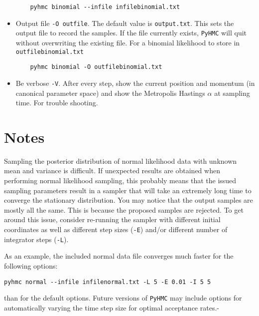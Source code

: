 \documentclass[10pt,letterpaper]{article}
\begin{document}
\begin{itemize}
\begin{verbatim}
	pyhmc binomial --infile infilebinomial.txt
\end{verbatim}

	\item Output file \texttt{-O outfile}.  The default value is
		\texttt{output.txt}.  This sets the output file to record the samples.
		If the file currently exists, \texttt{PyHMC} will quit without
		overwriting the existing file.  For a binomial likelihood to store in
		\texttt{outfilebinomial.txt}

\begin{verbatim}
	pyhmc binomial -O outfilebinomial.txt
\end{verbatim}

	\item Be verbose \texttt{-V}.  After every step, show the current position
		and momentum (in canonical parameter space) and show the Metropolis
		Hastings $\alpha$ at sampling time.  For trouble shooting.
\end{itemize}

\section{Notes}
\label{sec:notes}

Sampling the posterior distribution of normal likelihood data with unknown mean
and variance is difficult. If unexpected results are obtained when performing
normal likelihood sampling, this probably means that the issued sampling
parameters result in a sampler that will take an extremely long time to
converge the stationary distribution.  You may notice that the output samples
are mostly all the same.  This is because the proposed samples are rejected.
To get around this issue, consider re-running the sampler with different
initial coordinates as well as different step sizes (\texttt{-E}) and/or
different number of integrator steps (\texttt{-L}).

As an example, the included normal data file converges much faster for the
following options:

\begin{verbatim}
pyhmc normal --infile infilenormal.txt -L 5 -E 0.01 -I 5 5
\end{verbatim}

\noindent
than for the default options.  Future versions of \texttt{PyHMC} may include
options for automatically varying the time step size for optimal acceptance
rates.-
\end{document}
